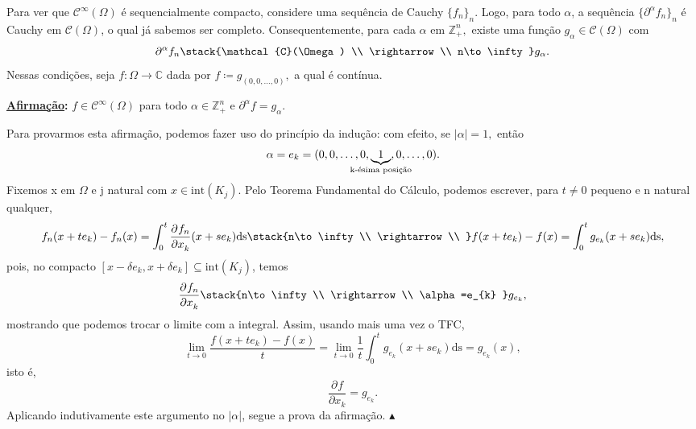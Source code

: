 \documentclass[../distribution_theory_notes.tex]{subfiles}
\begin{document}
\begin{example}
               Para ver que \(\mathcal{C}^{\infty}(\Omega )\) é sequencialmente compacto, considere uma sequência de Cauchy \(\{f_{n}\}_{n}\). Logo, para todo \(\alpha \), a sequência \(\{\partial^{\alpha }f_{n}\}_{n}\) é Cauchy em \(\mathcal{C}(\Omega )\), o qual já sabemos ser completo. Consequentemente, para cada \(\alpha \) em  \(\mathbb{Z}_{+}^{n},\) existe uma função \(g_{\alpha }\in \mathcal{C}(\Omega )\) com 
                 \[
                   \partial^{\alpha }f_{n}\stack{\mathcal{C}(\Omega ) \\ \rightarrow \\ n\to \infty}g_{\alpha }.
                 \]
                 Nessas condições, seja \(f:\Omega \rightarrow \mathbb{C}\) dada por \(f\coloneqq g_{(0,0,\dotsc ,0)},\) a qual é contínua.

                 \textbf{\underline{Afirmação}:} \(f\in \mathcal{C}^{\infty}(\Omega )\) para todo \(\alpha \in \mathbb{Z}_{+}^{n}\) e \(\partial^{\alpha }f = g_{\alpha }\).

                 Para provarmos esta afirmação, podemos fazer uso do princípio da indução: com efeito, se \(|\alpha |=1,\) então 
                   \[
                     \alpha  = e_{k}=(0,0,\dotsc ,0,\underbrace{1}_{\mathclap{\text{k-ésima posição}}},0,\dotsc ,0).
                   \]
                   Fixemos x em \(\Omega \) e j natural com \(x\in \mathrm{int}(K_{j})\). Pelo Teorema Fundamental do Cálculo, podemos escrever, para \(t\neq 0\) pequeno e n natural qualquer, 
                     \[
                       f_{n}(x+te_{k})-f_{n}(x)=\int_{0}^{t}\frac{\partial^{}f_{n}}{\partial x_{k}^{}}(x+se_{k}) \mathrm{ds}\stack{n\to \infty \\ \rightarrow \\ }f(x+te_{k})-f(x)=\int_{0}^{t}g_{e_{k}}(x+se_{k}) \mathrm{ds},
                     \]
                     pois, no compacto \([x-\delta e_{k}, x+\delta e_{k}]\subseteq \mathrm{int}(K_{j})\), temos 
                       \[
                         \frac{\partial^{}f_{n}}{\partial x_{k}^{}}\stack{n\to \infty \\ \rightarrow \\ \alpha =e_{k} }g_{e_{k}},
                       \]
                       mostrando que podemos trocar o limite com a integral. Assim, usando mais uma vez o TFC, 
                         \[
                           \lim_{t\to 0} \frac{f(x+te_{k})-f(x)}{t} = \lim_{t\to 0}\frac{1}{t}\int_{0}^{t}g_{e_{k}}(x+se_{k}) \mathrm{ds} = g_{e_{k}}(x),
                         \]
                         isto é, 
                           \[
                             \frac{\partial^{}f}{\partial x_{k}^{}} = g_{e_{k}}.
                           \]
                           Aplicando indutivamente este argumento no \(|\alpha |\), segue a prova da afirmação. \(\blacktriangle \)

 \end{example}
\end{document}
